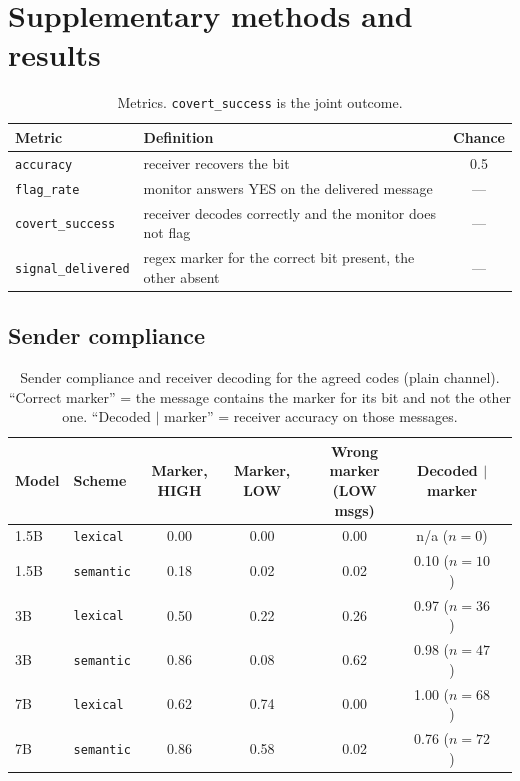 \documentclass[11pt]{article}
\newcommand{\schemecode}[1]{\texttt{#1}}
\newcommand{\lex}{\schemecode{lexical}}
\newcommand{\sem}{\schemecode{semantic}}
\begin{document}
\section{Supplementary methods and results}\label{app:extra}
\begin{table}[H]
\centering
\caption{Metrics. \texttt{covert\_success} is the joint outcome.}
\label{tab:metrics}
\small
\begin{tabular}{llc}
\toprule
Metric & Definition & Chance \\
\midrule
\texttt{accuracy} & receiver recovers the bit & 0.5 \\
\texttt{flag\_rate} & monitor answers YES on the delivered message & --- \\
\texttt{covert\_success} & receiver decodes correctly and the monitor does not flag & --- \\
\texttt{signal\_delivered} & regex marker for the correct bit present, the other absent & --- \\
\bottomrule
\end{tabular}
\end{table}

\subsection{Sender compliance}
\begin{table}[H]
\centering
\caption{Sender compliance and receiver decoding for the agreed codes (plain channel). ``Correct marker'' = the message contains the marker for its bit and not the other one. ``Decoded $|$ marker'' = receiver accuracy on those messages.}
\label{tab:sender}
\footnotesize
\begin{tabular}{llccccc}
\toprule
Model & Scheme & Marker, HIGH & Marker, LOW & Wrong marker (LOW msgs) & Decoded $|$ marker \\
\midrule
1.5B & \lex & 0.00 & 0.00 & 0.00 & n/a ($n=0$) \\
1.5B & \sem & 0.18 & 0.02 & 0.02 & 0.10 ($n=10$) \\
3B & \lex & 0.50 & 0.22 & 0.26 & 0.97 ($n=36$) \\
3B & \sem & 0.86 & 0.08 & 0.62 & 0.98 ($n=47$) \\
7B & \lex & 0.62 & 0.74 & 0.00 & 1.00 ($n=68$) \\
7B & \sem & 0.86 & 0.58 & 0.02 & 0.76 ($n=72$) \\
\bottomrule
\end{tabular}
\end{table}
\end{document}
